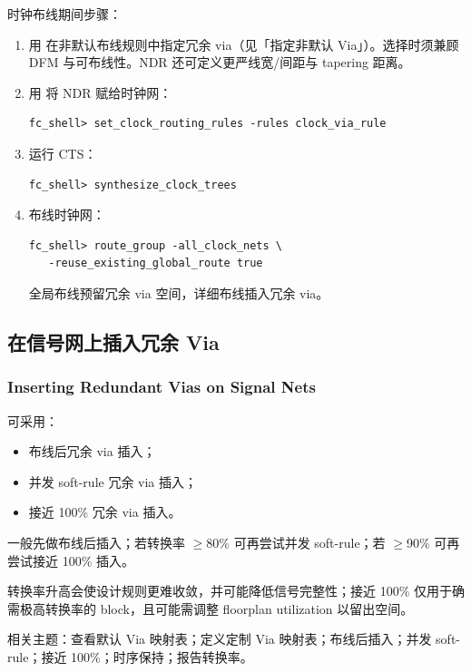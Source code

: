 时钟布线期间步骤：
\begin{enumerate}
  \item 用  在非默认布线规则中指定冗余 via（见「指定非默认 Via」）。选择时须兼顾 DFM 与可布线性。NDR 还可定义更严线宽/间距与 tapering 距离。
  \item 用  将 NDR 赋给时钟网：
\begin{lstlisting}
fc_shell> set_clock_routing_rules -rules clock_via_rule
\end{lstlisting}
  \item 运行 CTS：
\begin{lstlisting}
fc_shell> synthesize_clock_trees
\end{lstlisting}
  \item 布线时钟网：
\begin{lstlisting}
fc_shell> route_group -all_clock_nets \
   -reuse_existing_global_route true
\end{lstlisting}
        全局布线预留冗余 via 空间，详细布线插入冗余 via。
\end{enumerate}

\subsection{在信号网上插入冗余 Via}
\subsubsection*{Inserting Redundant Vias on Signal Nets}

可采用：
\begin{itemize}
  \item 布线后冗余 via 插入；
  \item 并发 soft-rule 冗余 via 插入；
  \item 接近 100\% 冗余 via 插入。
\end{itemize}

一般先做布线后插入；若转换率 $\ge$80\% 可再尝试并发 soft-rule；若 $\ge$90\% 可再尝试接近 100\% 插入。

\begin{noteBox}
转换率升高会使设计规则更难收敛，并可能降低信号完整性；接近 100\% 仅用于确需极高转换率的 block，且可能需调整 floorplan utilization 以留出空间。
\end{noteBox}

相关主题：查看默认 Via 映射表；定义定制 Via 映射表；布线后插入；并发 soft-rule；接近 100\%；时序保持；报告转换率。

